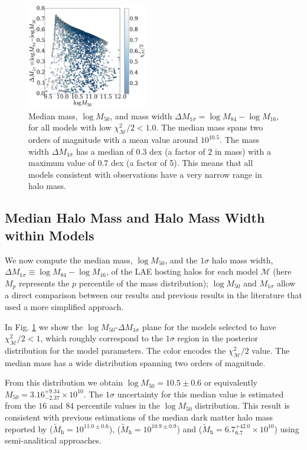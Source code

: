 \documentclass{emulateapj}
\newcommand{\hMsun}{{\ifmmode{h^{-1}{\rm {M_{\odot}}}}\else{$h^{-1}{\rm{M_{\odot}}}$}\fi}}
\begin{document}
\begin{figure}
\includegraphics[width=0.47\textwidth]{fig4.pdf}
\caption{Median mass, $\log M_{50}$, and mass width $\Delta
  M_{1\sigma}=\log M_{84} - \log M_{16}$, for all models with low
  $\chi^2_{\mathcal{M}}/2 < 1.0$. 
  The median mass spans two orders of magnitude with a mean value
  around $10^{10.5}$\hMsun.   
  The mass width $\Delta M_{1\sigma}$ has a median of $0.3$ dex (a factor
  of $2$ in mass) with a maximum value of $0.7$ dex (a factor of
  5). This means that all models consistent with observations have a
  very narrow range in halo mass.}
\label{fig:mmed}
\end{figure}

\subsection{Median Halo Mass and Halo Mass Width within Models}

We now compute the median mass, $\log M_{50}$, and the $1\sigma$ halo mass
width, $\Delta M_{1\sigma} \equiv \log M_{84} - \log M_{16}$, of the
LAE hosting halos for each model  $\mathcal{M}$ (here $M_{p}$
represents the $p$ percentile of the mass distribution); $\log M_{50}$
and $M_{1\sigma}$ allow a direct comparison between our results and
previous results in the literature
\citep[e.g.][]{Hayashino2004,Gawiser2007,Ouchi2010,Bielby16} that used
a more simplified approach. 

In Fig. \ref{fig:mmed} we show the $\log M_{50}$-$\Delta M_{1\sigma}$
plane for the models selected to have $\chi^{2}_{\mathcal{M}}/2 < 1$,
which roughly correspond to the $1\sigma$ region in the posterior
distribution for the model parameters. The color encodes the
$\chi^{2}_{\mathcal{M}}/2$ value. The median mass has a wide distribution
spanning two orders of magnitude.

From this distribution we obtain $\log M_{50} = 10.5\pm 0.6$ or
equivalently $M_{50} = 3.16^{+9.34}_{-2.37}\times 10^{10}$\hMsun.  
The $1\sigma$ uncertainty for this median value is estimated from the
$16$ and $84$ percentile values in the $\log M_{50}$ distribution.  
This result is consistent with previous
 estimations of  the  median dark matter halo mass reported by
 \citet{Bielby16} ($\tilde{M}_{\mathrm h} = 10^{11.0\pm0.6}$),
 \citet{Gawiser07} ($\tilde{M}_{\mathrm h} = 10^{10.9\pm0.9}$) and
 \citet{Ouchi2010} ($\tilde{M}_{\mathrm h} =
 6.7^{+42.0}_{6.7}\times10^{10}$) using semi-analitical approaches.   
\end{document}
